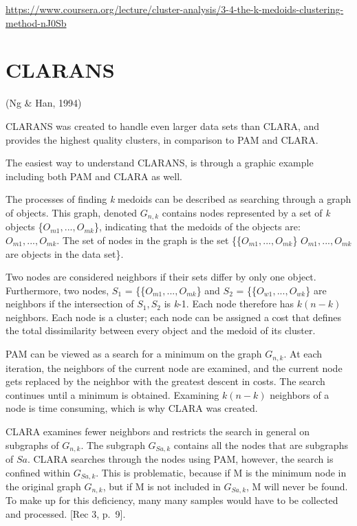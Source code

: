 \documentclass[12pt,twoside]{amherstthesis}
\begin{document}
  \url{https://www.coursera.org/lecture/cluster-analysis/3-4-the-k-medoids-clustering-method-nJ0Sb}
  
  \section{CLARANS}\label{clarans}
  
  (Ng \& Han, 1994)
  
  CLARANS was created to handle even larger data sets than CLARA, and
  provides the highest quality clusters, in comparison to PAM and CLARA.
  
  The easiest way to understand CLARANS, is through a graphic example
  including both PAM and CLARA as well.
  
  The processes of finding \emph{k} medoids can be described as searching
  through a graph of objects. This graph, denoted \(G_{n,k}\) contains
  nodes represented by a set of \emph{k} objects
  \{\(O_{m1},... , O_{mk}\)\}, indicating that the medoids of the objects
  are: \(O_{m1},... , O_{mk}\). The set of nodes in the graph is the set
  \{\{\(O_{m1},... , O_{mk}\)\} \textbar{} \(O_{m1},... , O_{mk}\) are
  objects in the data set\}.
  
  Two nodes are considered neighbors if their sets differ by only one
  object. Furthermore, two nodes, \(S_1\) = \{\{\(O_{m1},... , O_{mk}\)\}
  and \(S_2\) = \{\{\(O_{w1},... , O_{wk}\)\} are neighbors if the
  intersection of \(S_1, S_2\) is \emph{k}-1. Each node therefore has
  \(k(n-k)\) neighbors. Each node is a cluster; each node can be assigned
  a cost that defines the total dissimilarity between every object and the
  medoid of its cluster.
  
  PAM can be viewed as a search for a minimum on the graph \(G_{n,k}\). At
  each iteration, the neighbors of the current node are examined, and the
  current node gets replaced by the neighbor with the greatest descent in
  costs. The search continues until a minimum is obtained. Examining
  \(k(n-k)\) neighbors of a node is time consuming, which is why CLARA was
  created.
  
  CLARA examines fewer neighbors and restricts the search in general on
  subgraphs of \(G_{n,k}\). The subgraph \(G_{Sa,k}\) contains all the
  nodes that are subgraphs of \(Sa\). CLARA searches through the nodes
  using PAM, however, the search is confined within \(G_{Sa,k}\). This is
  problematic, because if M is the minimum node in the original graph
  \(G_{n,k}\), but if M is not included in \(G_{Sa,k}\), M will never be
  found. To make up for this deficiency, many many samples would have to
  be collected and processed. {[}Rec 3, p.~9{]}.
  
\end{document}
